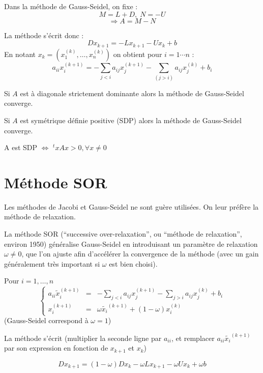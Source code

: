 Dans la méthode de Gauss-Seidel, on fixe :
\[
    M = L + D, \; N = -U
\]
\[
    \Rightarrow A = M - N
\]

La méthode s'écrit donc :
\[
    Dx_{k+1} = -Lx_{k+1}-Ux_k + b
\]
En notant $x_k = (x^{(k)}_1,\dots,x^{(k)}_n)$ on obtient pour $i = 1 \cdots n$ :
\[
    a_{ii}x^{(k+1)}_i = - \sum_{j<i}a_{ij}x_j^{(k+1)} - \sum_{(j>i)}a_{ij}x_j^{(k)} + b_i
\]

\begin{ftheo}
    Si $A$ est à diagonale strictement dominante alors la méthode de Gauss-Seidel converge.
\end{ftheo}

\begin{ftheo}
    Si $A$ est symétrique définie positive (SDP) alors la méthode de Gauss-Seidel converge.
\end{ftheo}

A est SDP $\Leftrightarrow$ $^txAx > 0, \forall x \ne 0$


\section{Méthode SOR}

Les méthodes de Jacobi et Gauss-Seidel ne sont guère utilisées. On leur préfère la méthode de relaxation.

La méthode SOR (``successive over-relaxation'', ou ``méthode de relaxation'', environ 1950) généralise Gauss-Seidel en introduisant un paramètre de relaxation $\omega \ne 0$,
que l'on ajuste afin d'accélérer la convergence de la méthode (avec un gain généralement très important si $\omega$ est bien choisi).

Pour $i=1,\dots,n$
\begin{equation}
\left\lbrace
\begin{array}{ccc}
    a_{ii}\tilde{x}_i^{(k+1)} & = & -\sum_{j<i} a_{ij}x_j^{(k+1)} - \sum_{j>i}a_{ij}x_j^{(k)} + b_i\\
    x_i^{(k+1)} & = & \omega \tilde{x_i}^{(k+1)} + (1-\omega)x_i^{(k)}
    \label{eq:4}
\end{array}\right.
\end{equation}
(Gauss-Seidel correspond à $\omega = 1$)

La méthode s'écrit (multiplier la seconde ligne par $a_{ii}$, et remplacer $a_{ii}\tilde{x_i}^{(k+1)}$ par son expression en fonction de $x_{k+1}$ et $x_k$)

\[
    Dx_{k+1}=(1-\omega)Dx_k - \omega L x_{k+1} - \omega U x_k + \omega b
\]

